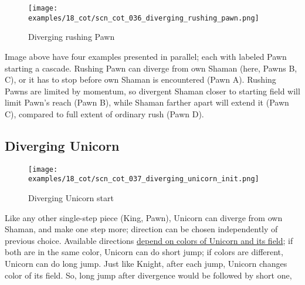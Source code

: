 \vspace*{-1.4\baselineskip}
\noindent
\begin{figure}[!h]
\texttt{[image: examples/18\_cot/scn\_cot\_036\_diverging\_rushing\_pawn.png]}
\vspace*{-1.3\baselineskip}
\caption{Diverging rushing Pawn}
\label{fig:scn_cot_036_diverging_rushing_pawn}
\end{figure}

\vspace*{-0.5\baselineskip}
Image above have four examples presented in parallel; each with labeled Pawn starting
a cascade. \newline
\indent
Rushing Pawn can diverge from own Shaman (here, Pawns B, C), or it has to stop before
own Shaman is encountered (Pawn A). Rushing Pawns are limited by momentum, so
divergent Shaman closer to starting field will limit Pawn's reach (Pawn B), while
Shaman farther apart will extend it (Pawn C), compared to full extent of ordinary
rush (Pawn D).

\clearpage %

\subsection*{Diverging Unicorn}
\label{sec:Conquest of Tlalocan/Divergence/Diverging Unicorn}

\vspace*{-1.4\baselineskip}
\noindent
\begin{figure}[!h]
\texttt{[image: examples/18\_cot/scn\_cot\_037\_diverging\_unicorn\_init.png]}
\vspace*{-1.3\baselineskip}
\caption{Diverging Unicorn start}
\label{fig:scn_cot_037_diverging_unicorn_init}
\end{figure}

\vspace*{-0.5\baselineskip}
Like any other single-step piece (King, Pawn), Unicorn can diverge from own Shaman,
and make one step more; direction can be chosen independently of previous choice.
Available directions
\hyperref[fig:scn_aoa_01_unicorn_same_color]{depend on colors of Unicorn and its field};
if both are in the same color, Unicorn can do short jump; if colors are different, Unicorn
can do long jump. Just like Knight, after each jump, Unicorn changes color of its field.
So, long jump after divergence would be followed by short one,

